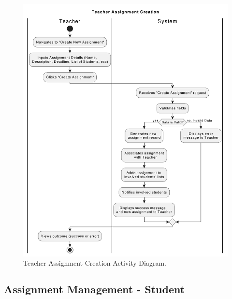 \begin{figure}[h]
    \centering
    \includegraphics[width=1\linewidth]{SRS/imgs/2_TeacherManagementAD.pdf}
    \caption{Teacher Assignment Creation Activity Diagram.}
    \label{fig:TeacherAssignmentCreationAD}
\end{figure}
\vspace*{\fill}

\clearpage
\vspace*{\fill}

\subsection{Assignment Management - Student}

